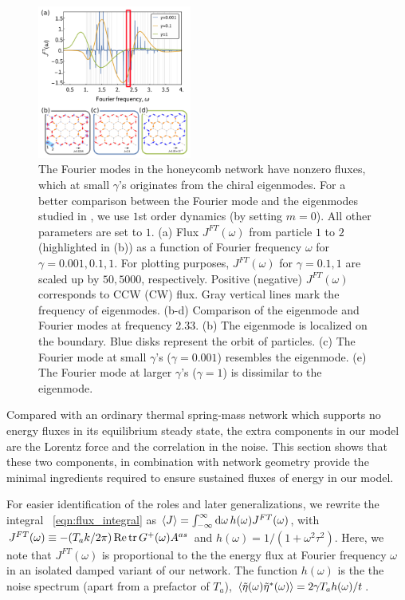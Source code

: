 \documentclass[
 preprint,
 preprintnumbers,
 amsmath,amssymb,
 aps,
 pre,
 longbibliography,
 superscriptaddress,
 10pt, twocolumn
]{revtex4-1}
\begin{document}
\begin{figure}[ht]
	\centering
	\includegraphics[width=0.45\textwidth]{2_Fourier_modes.pdf}
    \caption{The Fourier modes in the honeycomb network have nonzero fluxes, which at small $\gamma$'s originates from the chiral eigenmodes. For a better comparison between the Fourier mode and the eigenmodes studied in \cite{Nash2015TopologicalMechanics}, we use $1$st order dynamics (by setting $m=0$). All other parameters are set to $1$.
    (a) Flux $J^{FT}(\omega)$ from particle $1$ to $2$ (highlighted in (b)) as a function of Fourier frequency $\omega$ for $\gamma=0.001,0.1,1$. For plotting purposes, $J^{FT}(\omega)$ for $\gamma=0.1,1$ are scaled up by $50,5000$, respectively. Positive (negative) $J^{FT}(\omega)$ corresponds to CCW (CW) flux. Gray vertical lines mark the frequency of eigenmodes.
    (b-d) Comparison of the eigenmode and Fourier modes at frequency $2.33$.
    (b) The eigenmode is localized on the boundary. Blue disks represent the orbit of particles.
    (c) The Fourier mode at small $\gamma$'s ($\gamma=0.001$) resembles the eigenmode.
    (e) The Fourier mode at larger $\gamma$'s ($\gamma=1$) is dissimilar to the eigenmode.
    }
    \label{fig:Fourier_modes}
\end{figure}

Compared with an ordinary thermal spring-mass network which supports no energy fluxes in its equilibrium steady state, the extra components in our model are the Lorentz force and the correlation in the noise.
This section shows that these two components, in combination with network geometry provide the minimal ingredients required to ensure sustained fluxes of energy in our model.

For easier identification of the roles and later generalizations, we rewrite the integral \eqnname~\eqref{eqn:flux_integral} as $\expval{J} = \int_{-\infty}^\infty \dd{\omega} h(\omega) J^{FT}(\omega)$, with $J^{FT}(\omega) \equiv -(T_a k/2\pi) \Re \tr G^+(\omega)A^{as}$ and $h(\omega)=1/(1+\omega^2\tau^2)$. Here, we note that $J^{FT}(\omega)$ is proportional to the the energy flux at Fourier frequency $\omega$ in an isolated damped variant of our network. The function $h(\omega)$ is the the noise spectrum (apart from a prefactor of $T_a$), $\expval{\tilde{\eta}(\omega)\tilde{\eta}^*(\omega)} = 2\gamma T_a h(\omega) / t$.
\end{document}
